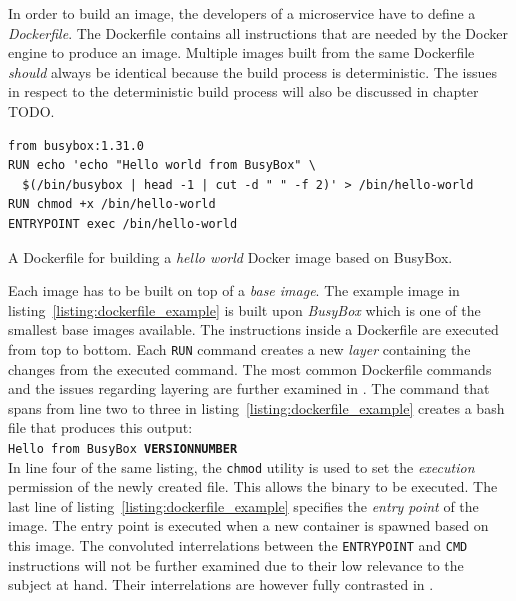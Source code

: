 In order to build an image, the developers of a microservice have to define a
\textit{Dockerfile}. The Dockerfile contains all instructions that are needed
by the Docker engine to produce an image. Multiple images built from the same
Dockerfile \textit{should} always be identical because the build process is
deterministic. The issues in respect to the deterministic build process will
also be discussed in chapter  TODO.

\begin{listing}[H]
\begin{verbatim}
from busybox:1.31.0
RUN echo 'echo "Hello world from BusyBox" \
  $(/bin/busybox | head -1 | cut -d " " -f 2)' > /bin/hello-world
RUN chmod +x /bin/hello-world
ENTRYPOINT exec /bin/hello-world
\end{verbatim}
\caption{A Dockerfile for building a \textit{hello world} Docker image based on BusyBox.}
\label{listing:dockerfile_example}
\end{listing}

Each image has to be built on top of a \textit{base image}. The example image
in listing~\ref{listing:dockerfile_example} is built upon \textit{BusyBox}
which is one of the smallest base images available. %
The instructions inside a Dockerfile are executed from top to bottom. Each
\texttt{RUN} command creates a new \textit{layer} containing the changes from
the executed command. The most common Dockerfile commands and the issues
regarding layering are further examined in
\autocite{DockerBestpracticeswriting}. The command that spans from line two to
three in listing~\ref{listing:dockerfile_example} creates a bash file that
produces this output: \\
\texttt{Hello from BusyBox \textbf{VERSION\textunderscore{}NUMBER}}\\
In line four of the same listing, the \texttt{chmod} utility is used to set the
\textit{execution} permission of the newly created file. This allows the binary
to be executed. The last line of listing~\ref{listing:dockerfile_example} specifies the
\textit{entry point} of the image. The entry point is executed when a new
container is spawned based on this image. The convoluted interrelations between
the \texttt{ENTRYPOINT} and \texttt{CMD} instructions will not be further
examined due to their low relevance to the subject at hand. Their
interrelations are however fully contrasted in
\autocite{DockerDockerfilereferenceEntrypoint}.

